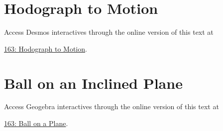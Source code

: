 \documentclass{ximera}
\begin{document}
\section{Hodograph to Motion}

\begin{exploration}
\begin{onlineOnly}
    \begin{center}
\end{center}
\end{onlineOnly}


Access Desmos interactives through the online version of this text at

 
\href{https://www.desmos.com/calculator/ljnsc6jsvt}{163: Hodograph to Motion}.

\end{exploration}



\section{Ball on an Inclined Plane}

\begin{exploration}
\begin{onlineOnly}
    \begin{center}
\end{center}
\end{onlineOnly}


Access Geogebra interactives through the online version of this text at

 
\href{https://www.geogebra.org/classic/rcmapxuh}{163: Ball on a Plane}.

\end{exploration}
\end{document}
